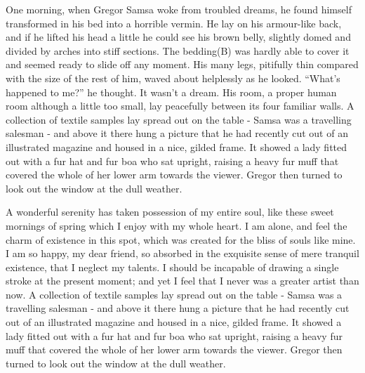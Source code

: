 \documentclass[twoside,12pt,a4paper]{scrbook}
\begin{document}
\begin{pages}
  \begin{Rightside}
    \beginnumbering\pstart
    One morning, when Gregor Samsa woke from
    troubled dreams, he found himself transformed in his bed into a
    horrible vermin. He lay on his armour-like back, and if he lifted his
    head a little he could see his brown belly, slightly domed and divided by
    arches into stiff sections. The bedding(B) was hardly able to
    cover it and seemed ready to slide off any moment. His many legs,
    pitifully thin compared with the size of the rest of him, waved about
    helplessly as he looked. \enquote{What's happened to me?} he thought. It
    wasn't a dream. His room, a proper human room although a
    little too small, lay peacefully between its four familiar walls. A
    collection of textile samples lay spread out on the table -
    Samsa was a travelling salesman - and
    above it there hung a picture that he had recently cut out of an
    illustrated magazine and housed in a nice, gilded frame. It showed a
    lady fitted out with a fur hat and fur boa who sat upright, raising a
    heavy fur muff that covered the whole of her lower arm towards the
    viewer. Gregor then turned to look out the window at the dull weather.

    A wonderful serenity has taken possession of my entire
    soul, like these sweet mornings of spring which I enjoy with my whole
    heart. I am alone, and feel the charm of existence in this spot, which was
    created for the bliss of souls like mine. I am so happy, my dear
    friend, so absorbed in the exquisite sense of mere tranquil existence,
    that I neglect my talents. I should be incapable of drawing a single
    stroke at the present moment; and yet I feel that I never was a greater
    artist than now. A collection of textile samples lay spread out on the
    table - Samsa was a travelling
    salesman - and above it there hung a picture that he had recently cut out
    of an illustrated magazine and housed in a nice, gilded frame. It
    showed a lady fitted out with a fur hat and fur boa who sat upright,
    raising a heavy fur muff that covered the whole of her lower arm
    towards the viewer. Gregor then turned to look out the window at the
    dull weather.
    \pend\endnumbering
  \end{Rightside}
  \Pages

\end{pages}
\end{document}
